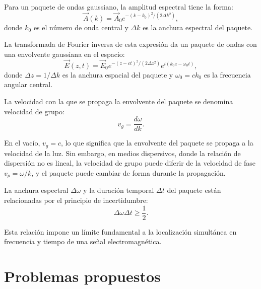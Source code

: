 \documentclass[12pt,a4paper]{book}
\begin{document}
Para un paquete de ondas gaussiano, la amplitud espectral tiene la forma:
\begin{equation}
\vec{A}(k) = \vec{A}_0 e^{-(k-k_0)^2/(2\Delta k^2)},
\end{equation}
donde $k_0$ es el número de onda central y $\Delta k$ es la anchura espectral del paquete.

La transformada de Fourier inversa de esta expresión da un paquete de ondas con una envolvente gaussiana en el espacio:
\begin{equation}
\vec{E}(z, t) = \vec{E}_0 e^{-(z-ct)^2/(2\Delta z^2)} e^{i(k_0 z - \omega_0 t)},
\end{equation}
donde $\Delta z = 1/\Delta k$ es la anchura espacial del paquete y $\omega_0 = ck_0$ es la frecuencia angular central.

La velocidad con la que se propaga la envolvente del paquete se denomina velocidad de grupo:
\begin{equation}
v_g = \frac{d\omega}{dk}.
\end{equation}

En el vacío, $v_g = c$, lo que significa que la envolvente del paquete se propaga a la velocidad de la luz. Sin embargo, en medios dispersivos, donde la relación de dispersión no es lineal, la velocidad de grupo puede diferir de la velocidad de fase $v_p = \omega/k$, y el paquete puede cambiar de forma durante la propagación.

La anchura espectral $\Delta \omega$ y la duración temporal $\Delta t$ del paquete están relacionadas por el principio de incertidumbre:
\begin{equation}
\Delta \omega \Delta t \geq \frac{1}{2}.
\end{equation}

Esta relación impone un límite fundamental a la localización simultánea en frecuencia y tiempo de una señal electromagnética.

\section{Problemas propuestos}
\end{document}
